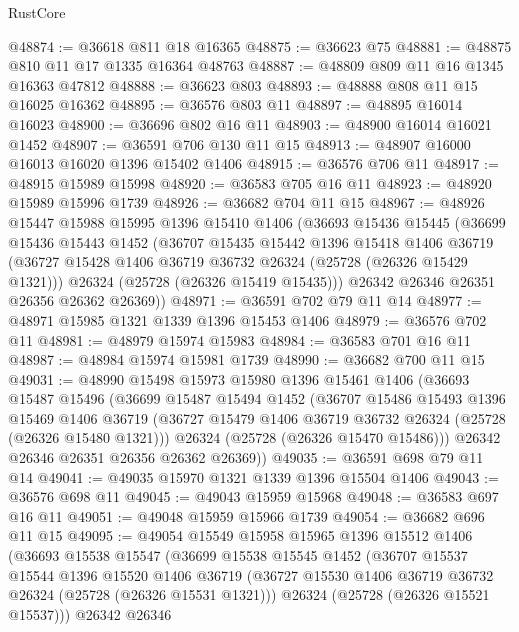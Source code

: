 \begin{lexlean}{RustCore}
\begin{coremodule}
@48874 := @36618 @811 @18 @16365
@48875 := @36623 @75
@48881 := @48875 @810 @11 @17 @1335 @16364 @48763
@48887 := @48809 @809 @11 @16 @1345 @16363 @47812
@48888 := @36623 @803
@48893 := @48888 @808 @11 @15 @16025 @16362
@48895 := @36576 @803 @11
@48897 := @48895 @16014 @16023
@48900 := @36696 @802 @16 @11
@48903 := @48900 @16014 @16021 @1452
@48907 := @36591 @706 @130 @11 @15
@48913 := @48907 @16000 @16013 @16020 @1396 @15402 @1406
@48915 := @36576 @706 @11
@48917 := @48915 @15989 @15998
@48920 := @36583 @705 @16 @11
@48923 := @48920 @15989 @15996 @1739
@48926 := @36682 @704 @11 @15
@48967 := @48926
    @15447
    @15988
    @15995
    @1396
    @15410
    @1406
    (@36693
      @15436
      @15445
      (@36699
        @15436
        @15443
        @1452
        (@36707
          @15435
          @15442
          @1396
          @15418
          @1406
          @36719
          (@36727 @15428 @1406 @36719 @36732 @26324 (@25728 (@26326 @15429 @1321)))
          @26324
          (@25728 (@26326 @15419 @15435)))
        @26342
        @26346
        @26351
        @26356
        @26362
        @26369))
@48971 := @36591 @702 @79 @11 @14
@48977 := @48971 @15985 @1321 @1339 @1396 @15453 @1406
@48979 := @36576 @702 @11
@48981 := @48979 @15974 @15983
@48984 := @36583 @701 @16 @11
@48987 := @48984 @15974 @15981 @1739
@48990 := @36682 @700 @11 @15
@49031 := @48990
    @15498
    @15973
    @15980
    @1396
    @15461
    @1406
    (@36693
      @15487
      @15496
      (@36699
        @15487
        @15494
        @1452
        (@36707
          @15486
          @15493
          @1396
          @15469
          @1406
          @36719
          (@36727 @15479 @1406 @36719 @36732 @26324 (@25728 (@26326 @15480 @1321)))
          @26324
          (@25728 (@26326 @15470 @15486)))
        @26342
        @26346
        @26351
        @26356
        @26362
        @26369))
@49035 := @36591 @698 @79 @11 @14
@49041 := @49035 @15970 @1321 @1339 @1396 @15504 @1406
@49043 := @36576 @698 @11
@49045 := @49043 @15959 @15968
@49048 := @36583 @697 @16 @11
@49051 := @49048 @15959 @15966 @1739
@49054 := @36682 @696 @11 @15
@49095 := @49054
    @15549
    @15958
    @15965
    @1396
    @15512
    @1406
    (@36693
      @15538
      @15547
      (@36699
        @15538
        @15545
        @1452
        (@36707
          @15537
          @15544
          @1396
          @15520
          @1406
          @36719
          (@36727 @15530 @1406 @36719 @36732 @26324 (@25728 (@26326 @15531 @1321)))
          @26324
          (@25728 (@26326 @15521 @15537)))
        @26342
        @26346

\end{coremodule}
\end{lexlean}

